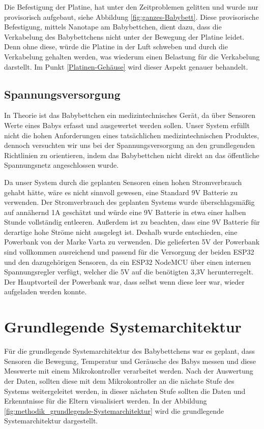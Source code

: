 \noindent
Die Befestigung der Platine, hat unter den Zeitproblemen gelitten und wurde nur provisorisch aufgebaut, siehe Abbildung \ref{fig:ganzes-Babybett}. 
Diese provisorische Befestigung, mittels Nanotape am Babybettchen, dient dazu, dass die Verkabelung des Babybettchens nicht unter der Bewegung der Platine leidet. 
Denn ohne diese, würde die Platine in der Luft schweben und durch die Verkabelung gehalten werden, was wiederum einen Belastung für die Verkabelung darstellt. 
Im Punkt \ref{Platinen-Gehäuse} wird dieser Aspekt genauer behandelt.

\subsection{Spannungsversorgung} 
In Theorie ist das Babybettchen ein medizintechnisches Gerät, da über Sensoren Werte eines Babys erfasst und ausgewertet werden sollen. 
Unser System erfüllt nicht die hohen Anforderungen eines tatsächlichen medizintechnischen Produktes, dennoch versuchten wir uns bei der Spannungsversorgung an den grundlegenden Richtlinien zu orientieren, indem das Babybettchen nicht direkt an das öffentliche Spannungsnetz angeschlossen wurde.

\par\vspace{1em}

\noindent
Da unser System durch die geplanten Sensoren einen hohen Stromverbrauch gehabt hätte, wäre es nicht sinnvoll gewesen, eine Standard 9V Batterie zu verwenden. 
Der Stromverbrauch des geplanten Systems wurde überschlagsmäßig auf annähernd 1A geschätzt und würde eine 9V Batterie in etwa einer halben Stunde vollständig entleeren. 
Außerdem ist zu beachten, dass eine 9V Batterie für derartige hohe Ströme nicht ausgelegt ist. Deshalb wurde entschieden, eine Powerbank von der Marke Varta zu verwenden. 
Die gelieferten 5V der Powerbank sind vollkommen ausreichend und passend für die Versorgung der beiden ESP32 und den dazugehörigen Sensoren, da ein ESP32 NodeMCU über einen internen Spannungsregler verfügt, welcher die 5V auf die benötigten 3,3V herunterregelt. Der Hauptvorteil der Powerbank war, dass selbst wenn diese leer war, wieder aufgeladen werden konnte.

\section[Grundlegende Systemarchitektur]{Grundlegende Systemarchitektur\authorlinda}
Für die grundlegende Systemarchitektur des Babybettchens war es geplant, dass Sensoren die Bewegung, Temperatur und Geräusche des Babys messen und diese Messwerte mit einem Mikrokontroller verarbeitet werden. Nach der Auswertung der Daten, sollten diese mit dem Mikrokontroller an die nächste Stufe des Systems weitergeleitet werden, in dieser nächsten Stufe sollten die Daten und Erkenntnisse für die Eltern visualisiert werden. 
In der Abbildung \ref{fig:methodik_grundlegende-Systemarchitektur} wird die grundlegende Systemarchitektur dargestellt.

